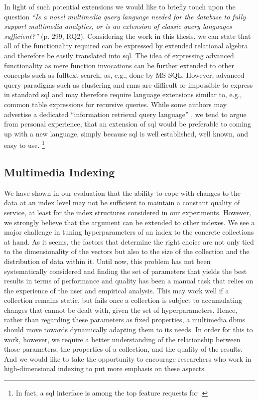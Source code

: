 In light of such potential extensions we would like to briefly touch upon the question  \emph{``Is a novel multimedia query language needed for the database to fully support multimedia analytics, or is an extension of classic query languages sufficient?''} \cite{Jonsson:2016Ten} (p. 299, RQ2). Considering the work in this thesis, we can state that all of the functionality required can be expressed by extended relational algebra and therefore be easily translated into \acrshort{sql}. The idea of expressing advanced functionality as mere function invocations can be further extended to other concepts such as fulltext search, as, e.g., done by MS-SQL. However, advanced query paradigms such as clustering and \acrshort{rnns} are difficult or impossible to express in standard \acrshort{sql} and may therefore require language extensions similar to, e.g., common table expressions for recursive queries. While some authors may advertise a dedicated ``information retrieval query language'' \cite{Ferro:2014Bridging}, we tend to argue from personal experience, that an extension of \acrshort{sql} would be preferable to coming up with a new language, simply because \acrshort{sql} is well established, well known, and easy to use. \footnote{In fact, a \acrshort{sql} interface is among the top feature requests for \cottontail{}.}

\subsection{Multimedia Indexing}

We have shown in our evaluation that the ability to cope with changes to the data at an index level may not be sufficient to maintain a constant quality of service, at least for the index structures considered in our experiments. However, we strongly believe that the argument can be extended to other indexes. We see a major challenge in tuning hyperparameters of an index to the concrete collections at hand. As it seems, the factors that determine the right choice are not only tied to the dimensionality of the vectors but also to the size of the collection and the distribution of data within it. Until now, this problem has not been systematically considered and finding the set of parameters that yields the best results in terms of performance and quality has been a manual task that relies on the experience of the user and empirical analysis. This may work well if a collection remains static, but fails once a collection is subject to accumulating changes that cannot be dealt with, given the set of hyperparameters. Hence, rather than regarding these parameters as fixed properties, a multimedia \acrshort{dbms} should move towards dynamically adapting them to its needs. In order for this to work, however, we require a better understanding of the relationship between those parameters, the properties of a collection, and the quality of the results. And we would like to take the opportunity to encourage researchers who work in high-dimensional indexing to put more emphasis on these aspects.


